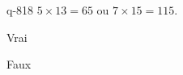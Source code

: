 \begin{truefalse}{q-818}
$5\times 13 = 65$ ou $7\times 15 = 115$.
\item* Vrai
\item Faux
\end{truefalse}

